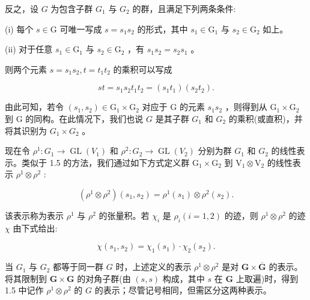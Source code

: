 \documentclass[10pt]{article}
\begin{document}
反之，设 \(G\) 为包含子群 \({G}_{1}\) 与 \({G}_{2}\) 的群，且满足下列两条条件:

(i) 每个 \(s \in  \mathrm{G}\) 可唯一写成 \(s = {s}_{1}{s}_{2}\) 的形式，其中 \({s}_{1} \in  {\mathrm{G}}_{1}\) 与 \({s}_{2} \in  {\mathrm{G}}_{2}\) 如上。

(ii) 对于任意 \({s}_{1} \in  {\mathrm{G}}_{1}\) 与 \({s}_{2} \in  {\mathrm{G}}_{2}\) ，有 \({s}_{1}{s}_{2} = {s}_{2}{s}_{1}\) 。

则两个元素 \(s = {s}_{1}{s}_{2},t = {t}_{1}{t}_{2}\) 的乘积可以写成

\[
{st} = {s}_{1}{s}_{2}{t}_{1}{t}_{2} = \left( {{s}_{1}{t}_{1}}\right) \left( {{s}_{2}{t}_{2}}\right) .
\]

由此可知，若令 \(\left( {{s}_{1},{s}_{2}}\right)  \in  {\mathrm{G}}_{1} \times  {\mathrm{G}}_{2}\) 对应于 \(\mathrm{G}\) 的元素 \({s}_{1}{s}_{2}\) ，则得到从 \({\mathrm{G}}_{1} \times  {\mathrm{G}}_{2}\) 到 \(\mathrm{G}\) 的同构。在此情况下，我们也说 \(G\) 是其子群 \({G}_{1}\) 和 \({G}_{2}\) 的乘积(或直积)，并将其识别为 \({G}_{1} \times  {G}_{2}\) 。

现在令 \({\rho }^{1} : {G}_{1} \rightarrow  \operatorname{GL}\left( {V}_{1}\right)\) 和 \({\rho }^{2} : {G}_{2} \rightarrow  \operatorname{GL}\left( {V}_{2}\right)\) 分别为群 \({G}_{1}\) 和 \({G}_{2}\) 的线性表示。类似于 1.5 的方法，我们通过如下方式定义群 \({\mathrm{G}}_{1} \times  {\mathrm{G}}_{2}\) 到 \({\mathrm{V}}_{1} \otimes  {\mathrm{V}}_{2}\) 的线性表示 \({\rho }^{1} \otimes  {\rho }^{2}\) :

\[
\left( {{\rho }^{1} \otimes  {\rho }^{2}}\right) \left( {{s}_{1},{s}_{2}}\right)  = {\rho }^{1}\left( {s}_{1}\right)  \otimes  {\rho }^{2}\left( {s}_{2}\right) .
\]

该表示称为表示 \({\rho }^{1}\) 与 \({\rho }^{2}\) 的张量积。若 \({\chi }_{i}\) 是 \({\rho }_{i}\left( {i = 1,2}\right)\) 的迹，则 \({\rho }^{1} \otimes  {\rho }^{2}\) 的迹 \(\chi\) 由下式给出:

\[
\chi \left( {{s}_{1},{s}_{2}}\right)  = {\chi }_{1}\left( {s}_{1}\right)  \cdot  {\chi }_{2}\left( {s}_{2}\right) .
\]

当 \({G}_{1}\) 与 \({G}_{2}\) 都等于同一群 \(G\) 时，上述定义的表示 \({\rho }^{1} \otimes  {\rho }^{2}\) 是对 \(\mathbf{G} \times  \overline{\mathbf{G}}\) 的表示。将其限制到 \(\mathbf{G} \times  \mathbf{G}\) 的对角子群(由 \(\left( {s,s}\right)\) 构成，其中 \(s\) 在 \(\mathbf{G}\) 上取遍)时，得到 1.5 中记作 \({\rho }^{1} \otimes  {\rho }^{2}\) 的 \(G\) 的表示；尽管记号相同，但需区分这两种表示。
\end{document}

